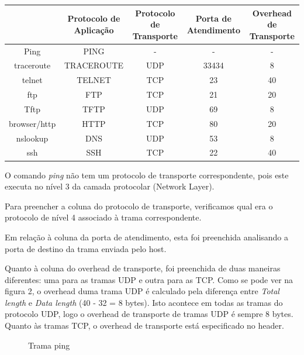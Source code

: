 \documentclass[11pt]{article}
\begin{document}
\begin{table}[hbt!]
    \begin{adjustbox}{width=\textwidth}
        \begin{tabular}{|c|c|c|c|c|}
\hline
& Protocolo de Aplicação & Protocolo de Transporte & Porta de Atendimento & Overhead de Transporte \\
\hline
Ping         & PING        &  -    &   -     &   -   \\
\hline
traceroute   & TRACEROUTE  & UDP   & 33434   & 8     \\
\hline
telnet       & TELNET      & TCP   & 23      & 40    \\
\hline
ftp          & FTP         & TCP   & 21      & 20    \\
\hline
Tftp         & TFTP        & UDP   & 69      & 8     \\
\hline
browser/http & HTTP        & TCP   & 80      & 20    \\
\hline
nslookup     & DNS         & UDP   & 53      & 8     \\
\hline
ssh          & SSH         & TCP   & 22      & 40    \\
\hline
        \end{tabular}
    \end{adjustbox}
\end{table}

O comando  \textit{ping} não tem um protocolo de transporte correspondente, pois este executa no nível 3 da camada protocolar (Network Layer).

Para preencher a coluna do protocolo de transporte, verificamos qual era o protocolo de nível 4 associado à trama correspondente.

Em relação à coluna da porta de atendimento, esta foi preenchida analisando a porta de destino da trama enviada pelo host.

Quanto à coluna do overhead de transporte, foi preenchida de duas maneiras diferentes: uma para as tramas UDP e outra para as TCP. Como se pode ver na figura 2, o overhead duma trama UDP é calculado pela diferença entre  \textit{Total length} e  \textit{Data length} (40 - 32 = 8 bytes). Isto acontece em todas as tramas do protocolo UDP, logo o overhead de transporte de tramas UDP é sempre 8 bytes. Quanto às tramas TCP, o overhead de transporte está especificado no header.

\vspace{0.5cm}

\begin{figure}[hbt!]
    \centering
    \caption{Trama ping}
\end{figure}
\end{document}
